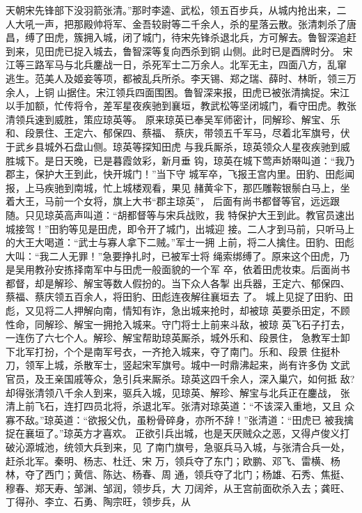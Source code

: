 天朝宋先锋部下没羽箭张清。”那时李逵、武松，领五百步兵，从城内抢出来，二
人大吼一声，把那殿帅将军、金吾较尉等二千余人，杀的星落云散。张清刺杀了唐
昌，缚了田虎，簇拥入城，闭了城门，待宋先锋杀退北兵，方可解去。鲁智深追赶
到来，见田虎已捉入城去，鲁智深等复向西杀到铜山侧。此时已是酉牌时分。
宋江等三路军马与北兵鏖战一日，杀死军士二万余人。北军无主，四面八方，乱窜
逃生。范美人及姬妾等项，都被乱兵所杀。李天锡、郑之瑞、薛时、林昕，领三万
余人，上铜山据住。宋江领兵四面围困。鲁智深来报，田虎已被张清擒捉。宋江
以手加额，忙传将令，差军星夜疾驰到襄垣，教武松等坚闭城门，看守田虎。教张
清领兵速到威胜，策应琼英等。
原来琼英已奉吴军师密计，同解珍、解宝、乐和、段景住、王定六、郁保四、蔡福、
蔡庆，带领五千军马，尽着北军旗号，伏于武乡县城外石盘山侧。琼英等探知田虎
与我兵厮杀，琼英领众人星夜疾驰到威胜城下。是日天晚，已是暮霞敛彩，新月垂
钩，琼英在城下莺声娇啭叫道：“我乃郡主，保护大王到此，快开城门！”当下守
城军卒，飞报王宫内里。田豹、田彪闻报，上马疾驰到南城，忙上城楼观看，果见
赭黄伞下，那匹雕鞍银鬃白马上，坐着大王，马前一个女将，旗上大书“郡主琼英”，
后面有尚书都督等官，远远跟随。只见琼英高声叫道：“胡都督等与宋兵战败，我
特保护大王到此。教官员速出城接驾！”田豹等见是田虎，即令开了城门，出城迎
接。二人才到马前，只听马上的大王大喝道：“武士与寡人拿下二贼。”军士一拥
上前，将二人擒住。田豹、田彪大叫：“我二人无罪！”急要挣扎时，已被军士将
绳索绑缚了。原来这个田虎，乃是吴用教孙安拣择南军中与田虎一般面貌的一个军
卒，依着田虎妆束。后面尚书都督，却是解珍、解宝等数人假扮的。当下众人各掣
出兵器，王定六、郁保四、蔡福、蔡庆领五百余人，将田豹、田彪连夜解往襄垣去
了。
城上见捉了田豹、田彪，又见将二人押解向南，情知有诈，急出城来抢时，却被琼
英要杀田定，不顾性命，同解珍、解宝一拥抢入城来。守门将士上前来斗敌，被琼
英飞石子打去，一连伤了六七个人。解珍、解宝帮助琼英厮杀，城外乐和、段景住，
急教军士卸下北军打扮，个个是南军号衣，一齐抢入城来，夺了南门。乐和、段景
住挺朴刀，领军上城，杀散军士，竖起宋军旗号。城中一时鼎沸起来，尚有许多伪
文武官员，及王亲国戚等众，急引兵来厮杀。琼英这四千余人，深入巢穴，如何抵
敌?却得张清领八千余人到来，驱兵入城，见琼英、解珍、解宝与北兵正在鏖战，
张清上前飞石，连打四员北将，杀退北军。张清对琼英道：“不该深入重地，又且
众寡不敌。”琼英道：“欲报父仇，虽粉骨碎身，亦所不辞！”张清道：“田虎已
被我擒捉在襄垣了。”琼英方才喜欢。
正欲引兵出城，也是天厌贼众之恶，又得卢俊义打破沁源城池，统领大兵到来，见
了南门旗号，急驱兵马入城，与张清合兵一处，赶杀北军。秦明、杨志、杜迁、宋
万，领兵夺了东门；欧鹏、邓飞、雷横、杨林，夺了西门；黄信、陈达、杨春、周
通，领兵夺了北门；杨雄、石秀、焦挺、穆春、郑天寿、邹渊、邹润，领步兵，大
刀阔斧，从王宫前面砍杀入去；龚旺、丁得孙、李立、石勇、陶宗旺，领步兵，从
